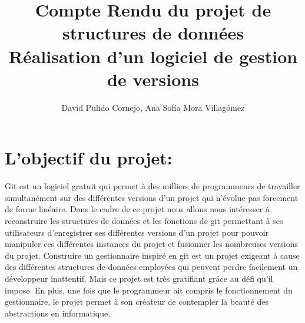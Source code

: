 \documentclass[11pt,francais]{article}
\begin{document}
\title{Compte Rendu du projet de structures de données \\ 
\large Réalisation d'un logiciel de gestion de versions}
\author{David Pulido Cornejo, Ana Sofía Mora Villagómez}
\maketitle
\section{L'objectif du projet:}
Git est un logiciel gratuit qui permet  à des milliers de programmeurs de travailler simultanément sur des différentes versions d’un projet qui n’évolue pas forcement de forme linéaire.  Dans le cadre de ce projet nous allons nous intéresser à reconstruire les structures de données et les fonctions de git permettant à ses utilisateurs d’enregistrer ses différentes versions d’un projet pour pouvoir manipuler ces différentes instances du projet et fusionner les nombreuses versions du projet.
	Construire un gestionnaire inspiré en git est un projet exigeant à cause des différentes structures de données employées qui peuvent perdre facilement un développeur inattentif. Mais ce projet est  très gratifiant grâce au défi qu’il impose. En plus, une fois que le programmeur ait compris le fonctionnement du gestionnaire, le projet permet à son créateur de contempler la beauté des abstractions en informatique.
\end{document}
